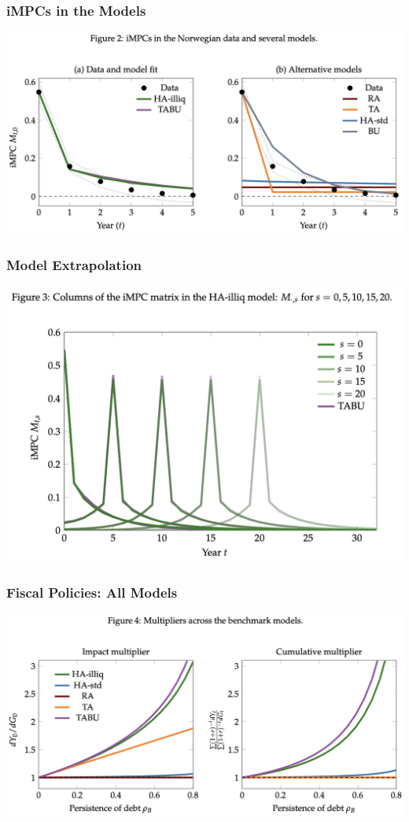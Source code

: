 \documentclass[english,xcolor=svgnames]{beamer}
\begin{document}
\begin{frame}
    \frametitle{iMPCs in the Models}
    \centering
    \includegraphics[scale=0.5]{figures/ARSFIG2.png}
\end{frame}


\begin{frame}
    \frametitle{Model Extrapolation}
    \centering
    \includegraphics[scale=0.5]{figures/ARSFIG3.png}
\end{frame}


\begin{frame}
    \frametitle{Fiscal Policies: All Models}
    \centering
    \includegraphics[scale=0.5]{figures/ARSFIG4.png}
\end{frame}
\end{document}
